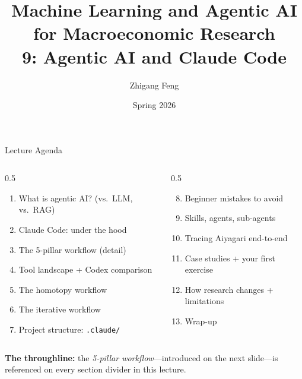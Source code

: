 \documentclass[10pt,english,aspectratio=169]{beamer}
\title[ML \& Agentic AI for Macro Research]{Machine Learning and Agentic AI for Macroeconomic Research\\
9: Agentic AI and Claude Code\\[0.5em]}
\author{Zhigang Feng}
\date{Spring 2026}
\newcommand\makebeamertitle{\frame{\maketitle}}%
\begin{document}
\makebeamertitle


\begin{frame}{Lecture Agenda}

\begin{columns}[T]
\begin{column}{0.5\textwidth}
\begin{enumerate}
    \item What is agentic AI? (vs.\ LLM, vs.\ RAG)
    \item Claude Code: under the hood
    \item The 5-pillar workflow (detail)
    \item Tool landscape + Codex comparison
    \item The homotopy workflow
    \item The iterative workflow
    \item Project structure: \texttt{.claude/}
\end{enumerate}
\end{column}
\begin{column}{0.5\textwidth}
\begin{enumerate}
    \setcounter{enumi}{7}
    \item Beginner mistakes to avoid
    \item Skills, agents, sub-agents
    \item Tracing Aiyagari end-to-end
    \item Case studies + your first exercise
    \item How research changes + limitations
    \item Wrap-up
\end{enumerate}
\end{column}
\end{columns}

\vspace{0.4cm}

\textbf{The throughline:} the \textit{5-pillar workflow}---introduced on the next slide---is referenced on every section divider in this lecture.
\end{frame}
\end{document}
